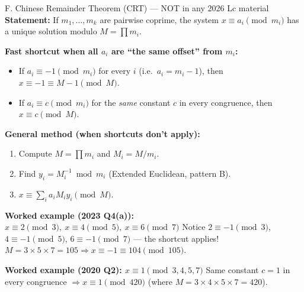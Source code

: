 \documentclass[12pt,a4paper]{article}
\begin{document}
\begin{algobox}{F. Chinese Remainder Theorem (CRT) --- NOT in any 2026 Lc material}
\textbf{Statement:} If $m_1,\dots,m_k$ are pairwise coprime, the system $x\equiv a_i \pmod{m_i}$ has a unique solution modulo $M=\prod m_i$.

\textbf{Fast shortcut when all $a_i$ are ``the same offset'' from $m_i$:}
\begin{itemize}[noitemsep]
  \item If $a_i \equiv -1 \pmod{m_i}$ for every $i$ (i.e.\ $a_i=m_i-1$), then $x \equiv -1 \equiv M-1 \pmod M$.
  \item If $a_i \equiv c \pmod{m_i}$ for the \emph{same} constant $c$ in every congruence, then $x\equiv c \pmod M$.
\end{itemize}

\textbf{General method (when shortcuts don't apply):}
\begin{enumerate}[noitemsep]
  \item Compute $M=\prod m_i$ and $M_i = M/m_i$.
  \item Find $y_i = M_i^{-1} \bmod m_i$ (Extended Euclidean, pattern B).
  \item $x \equiv \sum_i a_i M_i y_i \pmod M$.
\end{enumerate}

\textbf{Worked example (2023 Q4(a)): $x\equiv2\pmod3,\ x\equiv4\pmod5,\ x\equiv6\pmod7$}
Notice $2\equiv-1\pmod3$, $4\equiv-1\pmod5$, $6\equiv-1\pmod7$ --- the shortcut applies!
$M=3\times5\times7=105 \Rightarrow x\equiv-1\equiv\boxed{104}\pmod{105}$.

\textbf{Worked example (2020 Q2): $x\equiv1\pmod{3,4,5,7}$}
Same constant $c=1$ in every congruence $\Rightarrow x\equiv\boxed{1}\pmod{420}$ (where $M=3\times4\times5\times7=420$).
\end{algobox}
\end{document}

